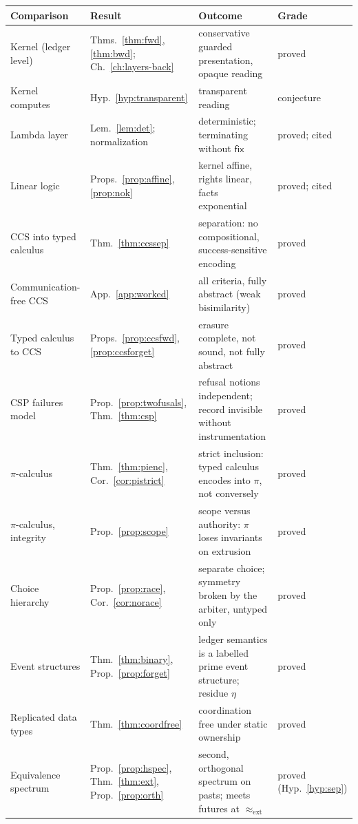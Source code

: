\documentclass[11pt,openany]{book}
\theoremstyle{remark}
\begin{document}
\begin{center}
\small
\begin{tabular}{L{2.8cm}L{3.6cm}L{4.4cm}L{1.6cm}}
\toprule
Comparison & Result & Outcome & Grade\\
\midrule
Kernel (ledger level) &
Thms.~\ref{thm:fwd}, \ref{thm:bwd}; Ch.~\ref{ch:layers-back} &
conservative guarded presentation, opaque reading &
proved\\
Kernel computes &
Hyp.~\ref{hyp:transparent} &
transparent reading &
conjecture\\
Lambda layer &
Lem.~\ref{lem:det}; normalization &
deterministic; terminating without $\mathsf{fix}$ &
proved; cited\\
Linear logic &
Props.~\ref{prop:affine}, \ref{prop:nok} &
kernel affine, rights linear, facts exponential &
proved; cited\\
CCS into typed calculus &
Thm.~\ref{thm:ccssep} &
separation: no compositional, success-sensitive encoding &
proved\\
Communication-free CCS &
App.~\ref{app:worked} &
all criteria, fully abstract (weak bisimilarity) &
proved\\
Typed calculus to CCS &
Props.~\ref{prop:ccsfwd}, \ref{prop:ccsforget} &
erasure complete, not sound, not fully abstract &
proved\\
CSP failures model &
Prop.~\ref{prop:twofusals}, Thm.~\ref{thm:csp} &
refusal notions independent; record invisible without instrumentation &
proved\\
$\pi$-calculus &
Thm.~\ref{thm:pienc}, Cor.~\ref{cor:pistrict} &
strict inclusion: typed calculus encodes into $\pi$, not conversely &
proved\\
$\pi$-calculus, integrity &
Prop.~\ref{prop:scope} &
scope versus authority: $\pi$ loses invariants on extrusion &
proved\\
Choice hierarchy &
Prop.~\ref{prop:race}, Cor.~\ref{cor:norace} &
separate choice; symmetry broken by the arbiter, untyped only &
proved\\
Event structures &
Thm.~\ref{thm:binary}, Prop.~\ref{prop:forget} &
ledger semantics is a labelled prime event structure; residue $\eta$ &
proved\\
Replicated data types &
Thm.~\ref{thm:coordfree} &
coordination free under static ownership &
proved\\
Equivalence spectrum &
Prop.~\ref{prop:hspec}, Thm.~\ref{thm:ext}, Prop.~\ref{prop:orth} &
second, orthogonal spectrum on pasts; meets futures at $\approx_{\mathrm{ext}}$ &
proved (Hyp.~\ref{hyp:sep})\\
\bottomrule
\end{tabular}
\end{center}
\end{document}
